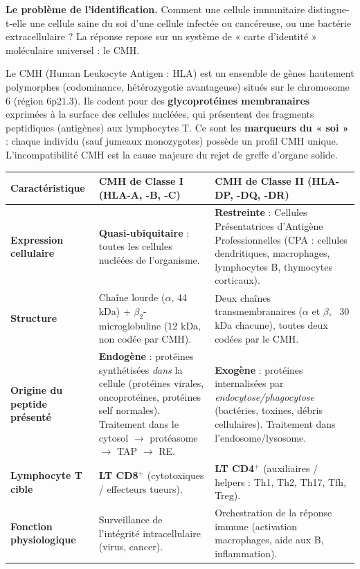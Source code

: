 \documentclass[11pt]{article}
\newcommand{\cle}[1]{{\popxbold\color{popdark}#1}}
\newcounter{popsec}
\newcounter{popsub}
\newcommand{\courssub}[1]{%
  \stepcounter{popsub}%
  \par\vspace{9pt}\noindent{\popxbold\fontsize{11.5}{13}\selectfont\color{popink}{\color{poporange}\thepopsec.\thepopsub}\hspace{6pt}#1}\par\nopagebreak\vspace{4pt}
}
\begin{document}
\courssub{La reconnaissance du non-soi : CMH, TCR et BCR}

\textbf{Le problème de l'identification.} Comment une cellule immunitaire distingue-t-elle une cellule saine du soi d'une cellule infectée ou cancéreuse, ou une bactérie extracellulaire ? La réponse repose sur un système de « carte d'identité » moléculaire universel : le CMH.

\begin{definition}
Le \cle{CMH} (Human Leukocyte Antigen : \cle{HLA}) est un ensemble de gènes hautement polymorphes (codominance, hétérozygotie avantageuse) situés sur le chromosome 6 (région 6p21.3). Ils codent pour des \textbf{glycoprotéines membranaires} exprimées à la surface des cellules nucléées, qui présentent des fragments peptidiques (antigènes) aux lymphocytes T. Ce sont les \textbf{marqueurs du « soi »} : chaque individu (sauf jumeaux monozygotes) possède un profil CMH unique. L'incompatibilité CMH est la cause majeure du rejet de greffe d'organe solide.
\end{definition}

\begin{propriete}
\begin{center}
\begin{tabularx}{\linewidth}{|l|X|X|}\hline
\rowcolor{popblueL}
\textbf{Caractéristique} & \textbf{CMH de Classe I (HLA-A, -B, -C)} & \textbf{CMH de Classe II (HLA-DP, -DQ, -DR)} \\ \hline
\textbf{Expression cellulaire} & \textbf{Quasi-ubiquitaire} : toutes les cellules nucléées de l'organisme. & \textbf{Restreinte} : Cellules Présentatrices d'Antigène Professionnelles (CPA : cellules dendritiques, macrophages, lymphocytes B, thymocytes corticaux). \\ \hline
\textbf{Structure} & Chaîne lourde ($\alpha$, 44 kDa) + $\beta_2$-microglobuline (12 kDa, non codée par CMH). & Deux chaînes transmembranaires ($\alpha$ et $\beta$, ~30 kDa chacune), toutes deux codées par le CMH. \\ \hline
\textbf{Origine du peptide présenté} & \textbf{Endogène} : protéines synthétisées \emph{dans} la cellule (protéines virales, oncoprotéines, protéines self normales). Traitement dans le cytosol $\rightarrow$ protéasome $\rightarrow$ TAP $\rightarrow$ RE. & \textbf{Exogène} : protéines internalisées par \emph{endocytose/phagocytose} (bactéries, toxines, débris cellulaires). Traitement dans l'endosome/lysosome. \\ \hline
\textbf{Lymphocyte T cible} & \textbf{LT CD8$^+$} (cytotoxiques / effecteurs tueurs). & \textbf{LT CD4$^+$} (auxiliaires / helpers : Th1, Th2, Th17, Tfh, Treg). \\ \hline
\textbf{Fonction physiologique} & Surveillance de l'intégrité intracellulaire (virus, cancer). & Orchestration de la réponse immune (activation macrophages, aide aux B, inflammation). \\ \hline
\end{tabularx}
\end{center}
\end{propriete}
\end{document}
